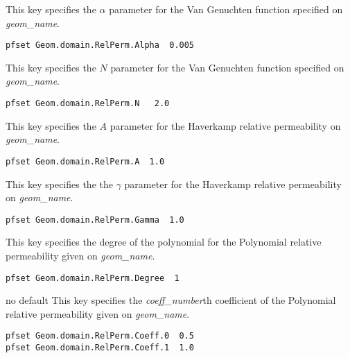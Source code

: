 {This key specifies the $\alpha$ parameter for the Van Genuchten function
specified on {\em geom\_name}.
}
\begin{display}\begin{verbatim}
pfset Geom.domain.RelPerm.Alpha  0.005
\end{verbatim}\end{display}

{This key specifies the $N$ parameter for the Van Genuchten function specified
on {\em geom\_name}.
}
\begin{display}\begin{verbatim}
pfset Geom.domain.RelPerm.N   2.0
\end{verbatim}\end{display}

{This key specifies the $A$ parameter for the Haverkamp relative permeability
on {\em geom\_name}.
}
\begin{display}\begin{verbatim}
pfset Geom.domain.RelPerm.A  1.0
\end{verbatim}\end{display}

{This key specifies the the $\gamma$ parameter for the Haverkamp relative
permeability on {\em geom\_name}.
}
\begin{display}\begin{verbatim}
pfset Geom.domain.RelPerm.Gamma  1.0
\end{verbatim}\end{display}

{This key specifies the degree of the polynomial for the Polynomial relative
permeability given on {\em geom\_name}.
}
\begin{display}\begin{verbatim}
pfset Geom.domain.RelPerm.Degree  1
\end{verbatim}\end{display}

{no default}
{This key specifies the {\em coeff\_number}th coefficient of the Polynomial
relative permeability given on {\em geom\_name}.
}
\begin{display}\begin{verbatim}
pfset Geom.domain.RelPerm.Coeff.0  0.5
pfset Geom.domain.RelPerm.Coeff.1  1.0
\end{verbatim}\end{display}

